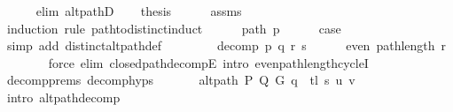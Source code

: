 \begin{isabellebody}
\ \ \ \ \isamarkupfalse%
\ {\isacharparenleft}{\kern0pt}elim\ alt{\isacharunderscore}{\kern0pt}pathD{\isacharparenleft}{\kern0pt}{}{\isacharparenright}{\kern0pt}{\isacharparenright}{\kern0pt}\isanewline
\ \ \isamarkupfalse%
\ {\isacharquery}{\kern0pt}thesis\isanewline
\ \ \ \ \isamarkupfalse%
\ assms\isanewline
\ \ \isamarkupfalse%
\ {\isacharparenleft}{\kern0pt}induction\ rule{\isacharcolon}{\kern0pt}\ path{\isacharunderscore}{\kern0pt}to{\isacharunderscore}{\kern0pt}distinct{\isacharunderscore}{\kern0pt}induct{\isacharparenright}{\kern0pt}\isanewline
\ \ \ \ \isamarkupfalse%
\ {\isacharparenleft}{\kern0pt}path\ p{\isacharparenright}{\kern0pt}\isanewline
\ \ \ \ \isamarkupfalse%
\ {\isacharquery}{\kern0pt}case\isanewline
\ \ \ \ \ \ \isamarkupfalse%
\ {\isacharparenleft}{\kern0pt}simp\ add{\isacharcolon}{\kern0pt}\ distinct{\isacharunderscore}{\kern0pt}alt{\isacharunderscore}{\kern0pt}path{\isacharunderscore}{\kern0pt}def{\isacharparenright}{\kern0pt}\isanewline
\ \ \isamarkupfalse%
\isanewline
\ \ \ \ \isamarkupfalse%
\ {\isacharparenleft}{\kern0pt}decomp\ p\ q\ r\ s{\isacharparenright}{\kern0pt}\isanewline
\ \ \ \ \isamarkupfalse%
\ {\isachardoublequoteopen}even\ {\isacharparenleft}{\kern0pt}path{\isacharunderscore}{\kern0pt}length\ r{\isacharparenright}{\kern0pt}{\isachardoublequoteclose}\isanewline
\ \ \ \ \ \ \isamarkupfalse%
\ {\isacharparenleft}{\kern0pt}force\ elim{\isacharcolon}{\kern0pt}\ closed{\isacharunderscore}{\kern0pt}path{\isacharunderscore}{\kern0pt}decompE{\isacharunderscore}{\kern0pt}{}\ intro{\isacharcolon}{\kern0pt}\ even{\isacharunderscore}{\kern0pt}path{\isacharunderscore}{\kern0pt}length{\isacharunderscore}{\kern0pt}cycleI{\isacharparenright}{\kern0pt}\isanewline
\ \ \ \ \isamarkupfalse%
\ decomp{\isachardot}{\kern0pt}prems{\isacharparenleft}{\kern0pt}{}{\isacharparenright}{\kern0pt}\ decomp{\isachardot}{\kern0pt}hyps{\isacharparenleft}{\kern0pt}{}{\isacharcomma}{\kern0pt}\ {}{\isacharparenright}{\kern0pt}\isanewline
\ \ \ \ \isamarkupfalse%
\ {\isachardoublequoteopen}alt{\isacharunderscore}{\kern0pt}path\ P\ Q\ G\ {\isacharparenleft}{\kern0pt}q\ {\isacharat}{\kern0pt}\ tl\ s{\isacharparenright}{\kern0pt}\ u\ v{\isachardoublequoteclose}\isanewline
\ \ \ \ \ \ \isamarkupfalse%
\ {\isacharparenleft}{\kern0pt}intro\ alt{\isacharunderscore}{\kern0pt}path{\isacharunderscore}{\kern0pt}decomp{\isacharparenright}{\kern0pt}\isanewline

\end{isabellebody}
